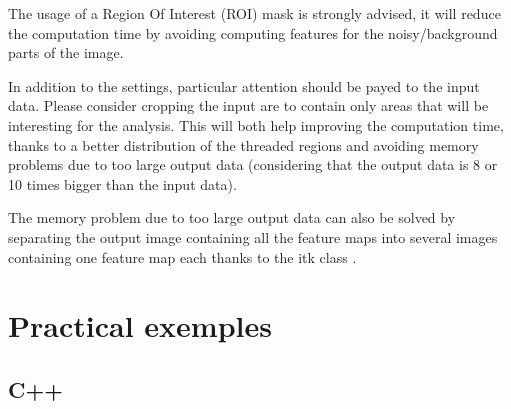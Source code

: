 \documentclass{InsightArticle}
\begin{document}
The usage of a Region Of Interest (ROI) mask is strongly advised, it will reduce the computation time by avoiding computing features for the noisy/background parts of the image.

In addition to the settings, particular attention should be payed to the input data. Please consider cropping the input are to contain only areas that will be interesting for the analysis. This will both help improving the computation time, thanks to a better distribution of the threaded regions and avoiding memory problems due to too large output data (considering that the output data is 8 or 10 times bigger than the input data).

The memory problem due to too large output data can also be solved by separating the output image containing all the feature maps into several images containing one feature map each thanks to the itk class .
\newpage
\section{Practical exemples}
\label{sec:exemples}

\subsection{C++}
\label{sec:C++Ex}
\end{document}
